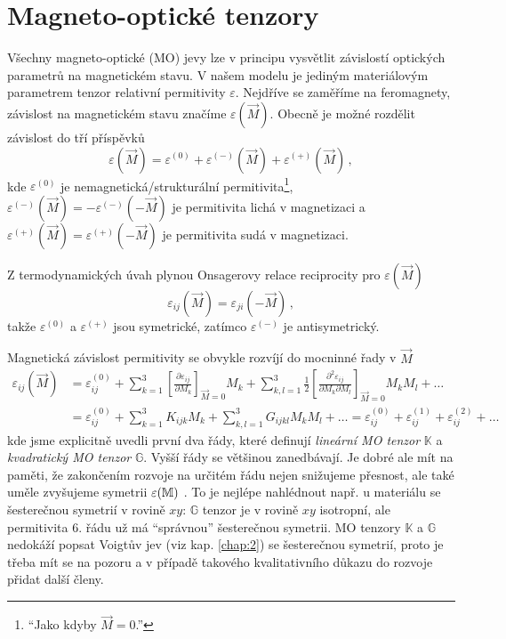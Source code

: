 \section{Magneto-optické tenzory}
\label{chap:magnetoopticke-tenzory}

Všechny magneto-optické (MO) jevy lze v principu vysvětlit závislostí optických parametrů na magnetickém stavu\cite{silberQuadraticMagnetoopticKerr2019a}.
V našem modelu je jediným materiálovým parametrem tenzor relativní permitivity $\varepsilon$.
Nejdříve se zaměříme na feromagnety, závislost na magnetickém stavu značíme $\varepsilon(\vec{M})$.
Obecně je možné rozdělit závislost do tří příspěvků
\begin{equation}
    \varepsilon(\vec{M})=\varepsilon^{(0)} + \varepsilon^{(-)}(\vec{M}) + \varepsilon^{(+)}(\vec{M}) \,,
\end{equation}
kde $\varepsilon^{(0)}$ je nemagnetická/strukturální permitivita\footnote{``Jako kdyby $\vec{M}=0$.''},
$\varepsilon^{(-)}(\vec{M})=-\varepsilon^{(-)}(-\vec{M})$ je permitivita lichá v magnetizaci
a $\varepsilon^{(+)}(\vec{M})=\varepsilon^{(+)}(-\vec{M})$ je permitivita sudá v magnetizaci.

Z termodynamických úvah plynou Onsagerovy relace reciprocity\cite{onsagerReciprocalRelationsIrreversible1931a,onsagerReciprocalRelationsIrreversible1931} pro $\varepsilon(\vec{M})$
\begin{equation}
    \varepsilon_{ij}(\vec{M})=\varepsilon_{ji}(-\vec{M}) \,,
\end{equation}
takže $\varepsilon^{(0)}$ a $\varepsilon^{(+)}$ jsou symetrické, zatímco $\varepsilon^{(-)}$ je antisymetrický.

Magnetická závislost permitivity se obvykle rozvíjí do mocninné řady v $\vec{M}$ \cite{visnovskyOpticsMagneticMultilayers2018}
\begin{align} 
\label{eqn:MO-tenzory}
    \varepsilon_{ij}(\vec{M})&=\varepsilon^{(0)}_{ij}
        + \sum_{k=1}^{3}\left[ \frac{\partial \varepsilon_{ij}}{\partial M_k}\right]_{\vec{M}=0} M_k 
        + \sum_{k,l=1}^{3} \frac{1}{2}\left[ \frac{\partial^2 \varepsilon_{ij}}{\partial M_k \partial M_l}\right]_{\vec{M}=0} M_k M_l + \dots 
    \\ &=\varepsilon^{(0)}_{ij} 
        + \sum_{k=1}^{3}K_{ijk} M_k 
        + \sum_{k,l=1}^{3} G_{ijkl} M_k M_l + \dots
        =\varepsilon^{(0)}_{ij} +\varepsilon^{(1)}_{ij} +\varepsilon^{(2)}_{ij} + \dots
\end{align}
kde jsme explicitně uvedli první dva řády, které definují \emph{lineární MO tenzor} $\mathbb{K}$ a \emph{kvadratický MO tenzor} $\mathbb{G}$.
Vyšší řády se většinou zanedbávají.
Je dobré ale mít na paměti, že zakončením rozvoje na určitém řádu nejen snižujeme přesnost, ale také uměle zvyšujeme symetrii $\varepsilon(\mathbb{M})$ \cite{silberQuadraticMagnetoopticKerr2019a}.
To je nejlépe nahlédnout např. u materiálu se šesterečnou symetrií v rovině $xy$: $\mathbb{G}$ tenzor je v rovině $xy$ isotropní, ale permitivita 6. řádu už má ``správnou'' šesterečnou symetrii.
MO tenzory $\mathbb{K}$ a $\mathbb{G}$ nedokáží popsat Voigtův jev (viz kap. \ref{chap:2}) se šesterečnou symetrií, proto je třeba mít se na pozoru a v případě takového kvalitativního důkazu do rozvoje přidat další členy.

